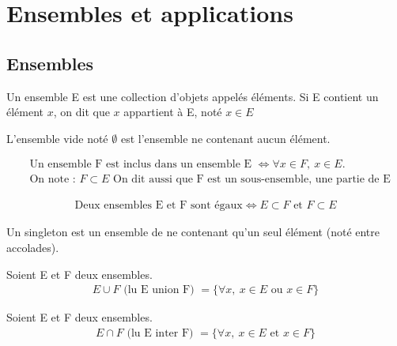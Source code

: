 \chapter{Ensembles et applications}
\section{Ensembles}

    \begin{definition}
	Un ensemble E est une collection d'objets appelés éléments.
	Si E contient un élément $x$, on dit que $x$ appartient à E, noté $x \in E$ 
\end{definition}

    \begin{definition}
	L'ensemble vide noté $\emptyset$ est l'ensemble ne contenant aucun élément.
\end{definition}

    \begin{definition}[Inclusion]
	\begin{align*}
		&\text{Un ensemble F est inclus dans un ensemble E } \iff \forall x \in F,\ x \in E. \\
		&\text{On note : } F \subset E \text{ On dit aussi que F est un sous-ensemble, une partie de E}
	\end{align*}
\end{definition}

    \begin{definition}
	\begin{align*}
		\text{Deux ensembles E et F sont égaux} \iff E \subset F \text{ et } F \subset E
	\end{align*} 
\end{definition}

\begin{definition}[Singleton]
	Un singleton est un ensemble de ne contenant qu'un seul élément (noté entre accolades).
\end{definition}

    \begin{definition}
	Soient E et F deux ensembles.
	\begin{align*}
		E \cup F \text{ (lu E union F) } = \{\forall x,\ x \in E \text{ ou } x \in F \}
	\end{align*}
\end{definition}

    \begin{definition}
	Soient E et F deux ensembles.
	\begin{align*}
		E \cap F \text{ (lu E inter F) } = \{\forall x,\ x \in E \text{ et } x \in F \}
	\end{align*}
\end{definition}


